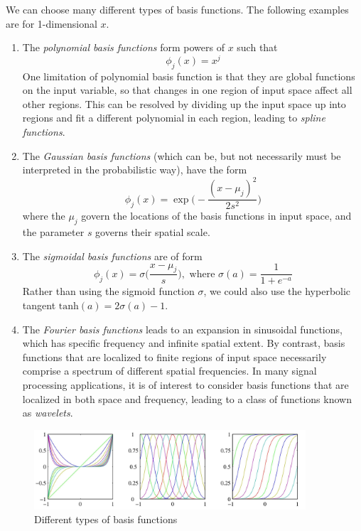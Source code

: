 \begin{example}
  We can choose many different types of basis functions. The following examples are for 1-dimensional $x$. 
  \begin{enumerate}
    \item The \textit{polynomial basis functions} form powers of $x$ such that
    \begin{equation}
      \phi_j (x) = x^j
    \end{equation}
    One limitation of polynomial basis function is that they are global functions on the input variable, so that changes in one region of input space affect all other regions. This can be resolved by dividing up the input space up into regions and fit a different polynomial in each region, leading to \textit{spline functions}.

    \item The \textit{Gaussian basis functions} (which can be, but not necessarily must be interpreted in the probabilistic way), have the form
    \begin{equation}
      \phi_j (x) = \exp \bigg(-\frac{(x - \mu_j)^2}{2 s^2}\bigg)
    \end{equation}
    where the $\mu_j$ govern the locations of the basis functions in input space, and the parameter $s$ governs their spatial scale.

    \item The \textit{sigmoidal basis functions} are of form
    \begin{equation}
      \phi_j (x) = \sigma \bigg( \frac{x - \mu_j}{s} \bigg), \text{ where } \sigma(a) = \frac{1}{1 + e^{-a}}
    \end{equation}
    Rather than using the sigmoid function $\sigma$, we could also use the hyperbolic tangent $\text{tanh}(a) = 2\sigma(a) - 1$.

    \item The \textit{Fourier basis functions} leads to an expansion in sinusoidal functions, which has specific frequency and infinite spatial extent. By contrast, basis functions that are localized to finite regions of input space necessarily comprise a spectrum of different spatial frequencies. In many signal processing applications, it is of interest to consider basis functions that are localized in both space and frequency, leading to a class of functions known as \textit{wavelets}.
  \end{enumerate}

  \begin{figure}[H]
    \centering
    \includegraphics[width=0.9\textwidth]{img/Linear_basis_functions.jpg}
    \caption{Different types of basis functions}
  \end{figure}
\end{example}

